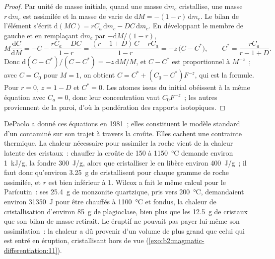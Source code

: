 \begin{proof}
Par unité de masse initiale, quand une masse $\mathrm dm_c$ cristallise, une masse
$r\,\mathrm dm_c$ est assimilée et la masse de  varie de $\mathrm dM =
-(1-r)\,\mathrm dm_c$. Le bilan de l'élément s'écrit $\mathrm d(MC) = rC_a\,\mathrm dm_c -
DC\,\mathrm dm_c$. En développant le membre de gauche et en remplaçant $\mathrm dm_c$ par
$-\mathrm dM/(1-r)$,
\[
M\frac{\mathrm dC}{\mathrm dM} = -C - \frac{rC_a - DC}{1-r}
= \frac{(r - 1 + D)\,C - rC_a}{1 - r} = -z\,\bigl(C - C^*\bigr),
\qquad C^* = \frac{rC_a}{r - 1 + D}.
\]
Donc $\mathrm d(C - C^*)/(C - C^*) = -z\,\mathrm dM/M$, et $C - C^*$ est proportionnel
à $M^{-z}$~; avec $C = C_0$ pour $M = 1$, on obtient $C = C^* + (C_0 - C^*)F^{-z}$, qui est la
formule. Pour $r = 0$, $z = 1 - D$ et $C^* = 0$. Les atomes issus du
 initial obéissent à la même équation avec $C_a = 0$, donc leur concentration vaut
$C_0F^{-z}$~; les autres proviennent de la paroi, d'où la pondération des rapports isotopiques.
\end{proof}

DePaolo a donné ces équations en 1981~; elles constituent le modèle standard d'un  contaminé
sur son trajet à travers la croûte. Elles cachent une contrainte thermique. La chaleur
nécessaire pour assimiler la roche vient de la chaleur latente des cristaux~: chauffer la croûte de 150 à
\qty{1150}{\celsius} demande environ \qty{1}{kJ/g}, la fondre \qty{300}{J/g}, alors que cristalliser
le  en libère environ \qty{400}{J/g}~; il faut donc qu'environ \qty{3.25}{g} de  cristallisent
pour chaque gramme de roche assimilée, et $r$ est bien inférieur à 1.
Wilcox a fait le même calcul pour le Parícutin~: ses \qty{25.4}{g} de monzonite quartzique, pris vers
\qty{200}{\celsius}, demandaient environ \qty{31350}{J} pour être
chauffés à \qty{1100}{\celsius} et fondus, la chaleur de cristallisation d'environ
\qty{85}{g} de plagioclase, bien plus que les \qty{12.5}{g} de cristaux que son bilan de
masse retirait. Le  éruptif ne pouvait pas payer lui-même son assimilation~:
la chaleur a dû provenir d'un volume de  plus grand que celui qui est entré en éruption,
cristallisant hors de vue (\cref{exo:b2:magmatic-differentiation:11}).

